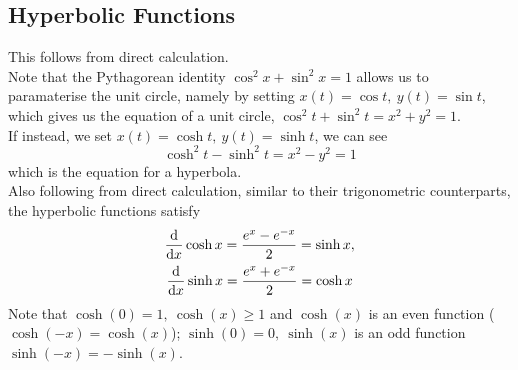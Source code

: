 \documentclass{report}
\begin{document}
\subsection{Hyperbolic Functions}
This follows from direct calculation. \\

Note that the Pythagorean identity $\cos^2x + \sin^2x = 1$ allows us to paramaterise the unit circle, namely by setting $x(t)=\cos t,\ y(t)=\sin t$, which gives us the equation of a unit circle, $\cos^2t+\sin^2t = x^2 + y^2 = 1$. \\

If instead, we set $x(t)=\cosh t,\ y(t)=\sinh t$, we can see
$$
  \cosh^2t - \sinh^2t = x^2 - y^2 = 1
$$
which is the equation for a hyperbola. \\
Also following from direct calculation, similar to their trigonometric counterparts, the hyperbolic functions satisfy
\begin{gather*}
  \frac{\mathrm{d}}{\mathrm{d} x}\cosh x = \frac{e^x - e^{-x}}{2} = \sinh x,\\ 
  \frac{\mathrm{d}}{\mathrm{d} x}\sinh x = \frac{e^x + e^{-x}}{2} = \cosh x
\end{gather*}
Note that $\cosh(0)=1,\ \cosh(x)\geq1$ and $\cosh(x)$ is an even function ($\cosh(-x) = \cosh(x)$); $\sinh(0)=0,\ \sinh(x)$ is an odd function $\sinh(-x) = -\sinh(x)$.
\end{document}
